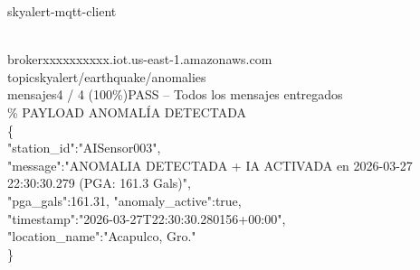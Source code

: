 \documentclass{skyalert-report}
\begin{document}
\newpage



\begin{tcolorbox}[
  enhanced,colback=mqttbg,colframe=mqttframe,boxrule=0.5pt,
  arc=4pt,left=8pt,right=8pt,top=6pt,bottom=6pt,
  shadow={0.5mm}{-0.5mm}{0mm}{black!20}
]
{\ttfamily\small\textcolor{mqttgreen}{\enspace skyalert-mqtt-client}}%
\hfill
{}\\[3mm]
{\ttfamily\footnotesize
\textcolor{mqttcyan}{broker}\hspace{10mm}\textcolor{mqttdim}{xxxxxxxxxx.iot.us-east-1.amazonaws.com}\\
\textcolor{mqttcyan}{topic}\hspace{11.5mm}\textcolor{mqttdim}{skyalert/earthquake/anomalies}\\
\textcolor{mqttcyan}{mensajes}\hspace{6mm}\textcolor{mqttdim}{4 / 4 (100\%)}\hspace{3mm}\textcolor{mqttgreen}{\enspace PASS -- Todos los mensajes entregados}\\[3mm]
\textcolor{mqttframe}{\% PAYLOAD ANOMAL\'IA DETECTADA}\\
\textcolor{mqttdim}{\{}\\
\hspace{4mm}\textcolor{mqttcyan}{"station\_id":}\hspace{2mm}\textcolor{mqttcyan!70!white}{"AISensor003"},\\
\hspace{4mm}\textcolor{mqttcyan}{"message":}\hspace{4mm}\textcolor{mqttcyan!70!white}{"ANOMALIA DETECTADA + IA ACTIVADA en 2026-03-27 22:30:30.279 (PGA: 161.3 Gals)"},\\
\hspace{4mm}\textcolor{mqttcyan}{"pga\_gals":}\hspace{3mm}\textcolor{accent}{161.31,}%
\hspace{3mm}\textcolor{mqttcyan}{"anomaly\_active":}\hspace{1mm}\textcolor{amberdark}{true},\\
\hspace{4mm}\textcolor{mqttcyan}{"timestamp":}\hspace{2mm}\textcolor{mqttcyan!70!white}{"2026-03-27T22:30:30.280156+00:00"},\\
\hspace{4mm}\textcolor{mqttcyan}{"location\_name":}\textcolor{mqttcyan!70!white}{"Acapulco, Gro."}\\
\textcolor{mqttdim}{\}}
}
\end{tcolorbox}
\end{document}
